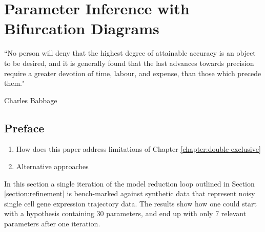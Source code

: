 \chapter{Parameter Inference with Bifurcation Diagrams}
\label{chapter:inference}
\epigraph{``No person will deny that the highest degree of attainable accuracy is an object to be desired, and it is generally found that the last advances towards precision require a greater devotion of time, labour, and expense, than those which precede them."}{Charles Babbage}

\section{Preface}
\begin{enumerate}
    \item How does this paper address limitations of Chapter \ref{chapter:double-exclusive} 
    \item Alternative approaches
\end{enumerate}

In this section a single iteration of the model reduction loop
outlined in Section \ref{section:refinement}
is bench-marked against synthetic data that represent noisy single cell
gene expression trajectory data. The results show how one could start
with a hypothesis containing 30 parameters, and end up with only
7 relevant parameters after one iteration.

